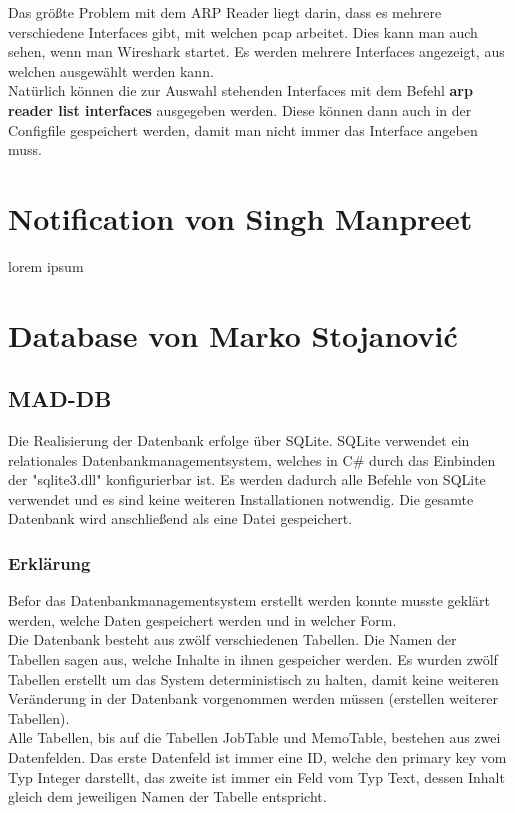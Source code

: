 \documentclass[12pt,a4paper]{report}
\begin{document}
\begin{onehalfspace}
Das größte Problem mit dem ARP Reader liegt darin, dass es mehrere verschiedene Interfaces gibt, mit welchen pcap arbeitet. Dies kann man auch sehen, wenn man Wireshark startet. Es werden mehrere Interfaces angezeigt, aus welchen ausgewählt werden kann.\\
Natürlich können die zur Auswahl stehenden Interfaces mit dem Befehl \textbf{arp reader list interfaces} ausgegeben werden. Diese können dann auch in der Configfile gespeichert werden, damit man nicht immer das Interface angeben muss.
\chapter{Notification von Singh Manpreet}
lorem ipsum


\chapter{Database von Marko Stojanovi\'{c}}
\section{MAD-DB}
Die Realisierung der Datenbank erfolge über SQLite. SQLite verwendet ein relationales Datenbankmanagementsystem, welches in C\# durch das Einbinden der "{}sqlite3.dll"{} konfigurierbar ist. Es werden dadurch alle Befehle von SQLite verwendet und es sind keine weiteren Installationen notwendig. Die gesamte Datenbank wird anschließend als eine Datei gespeichert.

\subsection{Erklärung}
Befor das Datenbankmanagementsystem erstellt werden konnte musste geklärt werden, welche Daten gespeichert werden und in welcher Form.\\

Die Datenbank besteht aus zwölf verschiedenen Tabellen. Die Namen der Tabellen sagen aus, welche Inhalte in ihnen gespeicher werden. Es wurden zwölf Tabellen erstellt um das System deterministisch zu halten, damit keine weiteren Veränderung in der Datenbank vorgenommen werden müssen (erstellen weiterer Tabellen).\\

Alle Tabellen, bis auf die Tabellen JobTable und MemoTable, bestehen aus zwei Datenfelden. Das erste Datenfeld ist immer eine ID, welche den primary key vom Typ Integer darstellt, das zweite ist immer ein Feld vom Typ Text, dessen Inhalt gleich dem jeweiligen Namen der Tabelle entspricht.\\


\end{onehalfspace}
\end{document}
